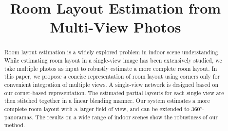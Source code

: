 \documentclass[sigconf]{acmart}
\newcommand{\comments}[1]{}
\begin{document}
\title{Room Layout Estimation from Multi-View Photos}

\comments{
\author{Ruifeng Deng}
\orcid{1234-5678-9012}
\affiliation{%
  \institution{University of Science and Technology of China}
  \streetaddress{P.O. Box 1212}
  \city{Hefei}
  \country{China}
  \postcode{43017-6221}
}
\email{trovato@corporation.com}

\author{Chaoyu Xie}
\affiliation{%
  \institution{University of Science and Technology of China}
  \streetaddress{P.O. Box 1212}
  \city{Hefei}
  \country{China}
  \postcode{43017-6221}
}
\email{webmaster@marysville-ohio.com}

\author{Xuejin Chen}
\affiliation{%
  \institution{University of Science and Technology of China}
  \streetaddress{1 Th{\o}rv{\"a}ld Circle}
  \city{Hefei}
  \country{China}}
\email{larst@affiliation.org}


\renewcommand{\shortauthors}{B. Trovato et al.}
}

\begin{abstract}
Room layout estimation is a widely explored problem in indoor scene understanding. %
While estimating room layout in a single-view image has been extensively studied, we take multiple photos as input to robustly estimate a more complete room layout. 
% 
In this paper, we propose a concise representation of room layout using corners only for convenient integration of multiple views. 
% 
A single-view network is designed based on our corner-based representation. 
The estimated partial layouts for each single view are then stitched together in a linear blending manner.
Our system estimates a more complete room layout with a larger field of view, and can be extended to \ang{360}-panoramas. 
The results on a wide range of indoor scenes show the robustness of our method. 
\end{abstract}
\end{document}
